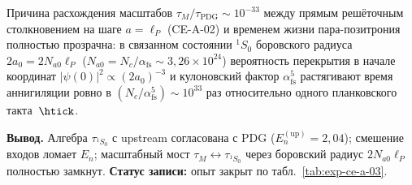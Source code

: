 Причина расхождения масштабов $\tau_M/\tau_{\mathrm{PDG}}\sim 10^{-33}$ между прямым решёточным столкновением на шаге $a=\ell_P$ (CE-A-02) и временем жизни пара-позитрония полностью прозрачна: в связанном состоянии $^1S_0$ боровского радиуса $2a_0 = 2N_{a0}\ell_P$ ($N_{a0} = N_c/\alpha_{\mathrm{fs}} \sim 3{,}26\times 10^{24}$) вероятность перекрытия в начале координат $|\psi(0)|^2 \propto (2a_0)^{-3}$ и кулоновский фактор $\alpha_{\mathrm{fs}}^5$ растягивают время аннигиляции ровно в $(N_c/\alpha_{\mathrm{fs}}^5)\sim 10^{33}$ раз относительно одного планковского такта~$\htick$.

\textbf{Вывод.}
Алгебра $\tau_{^1S_0}$ с upstream согласована с PDG ($E_n^{(\mathrm{up})} = 2{,}04$); смешение входов ломает $E_n$; масштабный мост $\tau_M \leftrightarrow \tau_{^1S_0}$ через боровский радиус $2N_{a0}\ell_P$ полностью замкнут.
\textbf{Статус записи:} опыт закрыт по табл.~\ref{tab:exp-ce-a-03}.

